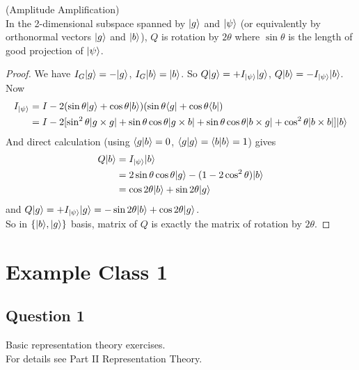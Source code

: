 \documentclass[a4paper]{article}
\begin{document}
\begin{thm} (Amplitude Amplification)\\
In the 2-dimensional subspace spanned by $|g\rangle$ and $|\psi\rangle$ (or equivalently by orthonormal vectors $|g\rangle$ and $|b\rangle$), $Q$ is rotation by $2\theta$ where $\sin\theta$ is the length of good projection of $|\psi\rangle$.
    \begin{proof}
        We have $I_G|g\rangle = -|g\rangle$, $I_G|b\rangle = |b\rangle$. So $Q|g\rangle = +I_{|\psi\rangle} |g\rangle$, $Q|b\rangle = -I_{|\psi\rangle} |b\rangle$.\\
        Now 
        \begin{equation*}
            \begin{aligned}
                I_{|\psi\rangle} &= I-2(\sin\theta|g\rangle + \cos\theta|b\rangle)(\sin\theta\langle g| + \cos\theta\langle b|)\\
                &= I-2[\sin^2\theta |g\times g| + \sin\theta\cos\theta |g\times b| + \sin\theta\cos\theta|b \times g| + \cos^2\theta |b\times b|] |b\rangle
            \end{aligned}
        \end{equation*}
        And direct calculation (using $\langle g| b\rangle =0$, $\langle g|g\rangle = \langle b|b\rangle = 1$) gives 
        \begin{equation*}
            \begin{aligned}
                Q|b\rangle &= I_{|\psi\rangle} |b\rangle\\
                &=2\sin\theta\cos\theta |g\rangle - (1-2\cos^2\theta) |b\rangle\\
                &= \cos 2\theta |b\rangle + \sin 2\theta|g\rangle
            \end{aligned}
        \end{equation*}
        and $Q|g\rangle = +I_{|\psi\rangle} |g\rangle = -\sin 2\theta |b\rangle + \cos 2\theta |g\rangle$.\\
        So in $\{|b\rangle,|g\rangle\}$ basis, matrix of $Q$ is exactly the matrix of rotation by $2\theta$.
    \end{proof}
\end{thm}

\newpage

\section{Example Class 1}

\subsection{Question 1}
Basic representation theory exercises.\\
For details see Part II Representation Theory.
\end{document}
